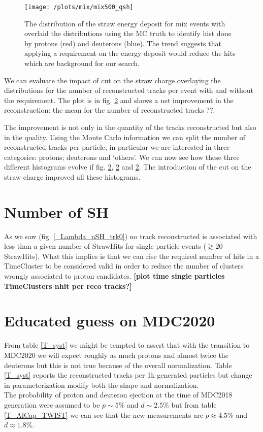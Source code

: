 \documentclass[12pt,a4paper,openright, oneside, titlepage]{book} %
\begin{document}
\begin{figure}[!htb]
\centering
\texttt{[image: /plots/mix/mix500\_qsh]}
\caption{The distribution of the straw energy deposit for mix events with overlaid the distributions using the MC truth to identify hist done by protons (red) and deuterons (blue). 
The trend suggests that applying a requirement on the energy deposit would reduce the hits which are background for our search.}
\label{_mix_proton_qsh}
\end{figure}

\noindent We can evaluate the impact of cut on the straw charge overlaying the distributions for the number of reconstructed tracks per event with and without the requirement. The plot is in fig. \ref{} and shows a net improvement in the reconstruction: the mean for the number of reconstructed tracks ??.

\noindent The improvement is not only in the quantity of the tracks reconstructed but also in the quality. 
Using the Monte Carlo information we can split the number of reconstructed tracks per particle, in particular we are interested in three categories: protons; deuterons and `others'.
We can now see how these three different histograms evolve if fig. \ref{}, \ref{} and \ref{}.
The introduction of the cut on the straw charge improved all these histograms.

\section{Number of SH}
As we saw (fig. \ref{_Lambda_nSH_trk0}) no track reconstructed is associated with less than a given number of StrawHits for single particle events ($\gtrsim 20$ StrawHits). 
What this implies is that we can rise the required number of hits in a TimeCluster to be considered valid in order to reduce the number of clusters wrongly associated to proton candidates.
\textbf{[plot time single particles TimeClusters nhit per reco tracks?]}

\section{Educated guess on MDC2020}
From table \ref{T_syst} we might be tempted to assert that with the transition to MDC2020 we will expect roughly as much protons and almost twice the deuterons but this is not true because of the overall normalization. 
Table \ref{T_syst} reports the reconstructed tracks per 1k generated particles but change in parameterization modify both the shape and normalization.\\
The probability of proton and deuteron ejection at the time of MDC2018 generation were assumed to be $p\sim5\%$ and $d\sim2.5\%$ but from table \ref{T_AlCap_TWIST} we can see that the new measurements are $p\approx4.5\%$ and $d\approx1.8\%$.
\end{document}
